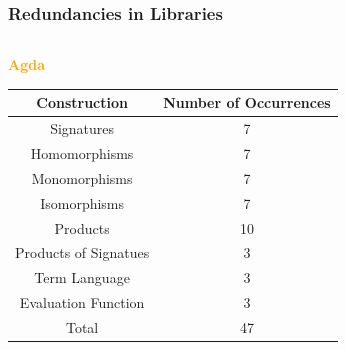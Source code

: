 \documentclass[t,10pt,numbers,fleqn,usenames,xcolor=dvipsnames]{beamer}
\begin{document}
\begin{frame}[fragile] 
\frametitle{Redundancies in Libraries} 
\begin{columns}
\begin{column}{0.45\textwidth}
\textcolor{Orange}{\textbf{Agda}}
\begin{table}
\begin{adjustbox}{width=0.9\columnwidth}
\begin{tabular}{| c || c |}
\hline 
\textbf{Construction} & \textbf{Number of Occurrences} \\ \hline 
Signatures & 7 \\ \hline
Homomorphisms & 7  \\ \hline
Monomorphisms & 7 \\ \hline
Isomorphisms & 7 \\ \hline
Products & 10 \\ \hline
Products of Signatues & 3 \\ \hline
Term Language & 3 \\ \hline
Evaluation Function & 3 \\ \hline\hline 
Total & 47 \\ \hline 
\end{tabular}
\end{adjustbox}
\end{table}


\end{column}
\end{columns}
\end{frame}
\end{document}
